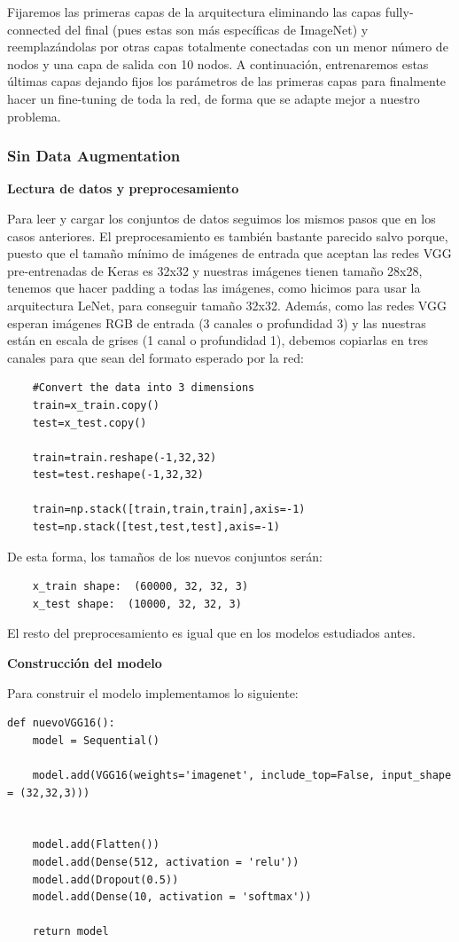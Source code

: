 \documentclass[a4paper,11pt]{article}
\begin{document}
Fijaremos las primeras capas de la arquitectura eliminando las capas fully-connected del final (pues estas son más específicas de ImageNet) y reemplazándolas por otras capas totalmente conectadas con un menor número de nodos y una capa de salida con 10 nodos. A continuación, entrenaremos estas últimas capas dejando fijos los parámetros de las primeras capas para finalmente hacer un fine-tuning de toda la red, de forma que se adapte mejor a nuestro problema. 

\subsubsection{Sin Data Augmentation}
\textbf{Lectura de datos y preprocesamiento}

Para leer y cargar los conjuntos de datos seguimos los mismos pasos que en los casos anteriores. El preprocesamiento es también bastante parecido salvo porque, puesto que el tamaño mínimo de imágenes de entrada que aceptan las redes VGG pre-entrenadas de Keras es 32x32 y nuestras imágenes tienen tamaño 28x28, tenemos que hacer padding a todas las imágenes, como hicimos para usar la arquitectura LeNet, para conseguir tamaño 32x32. Además, como las redes VGG esperan imágenes RGB de entrada (3 canales o profundidad 3) y las nuestras están en escala de grises (1 canal o profundidad 1), debemos copiarlas en tres canales para que sean del formato esperado por la red:
\begin{verbatim}
	#Convert the data into 3 dimensions
	train=x_train.copy()
	test=x_test.copy()
	
	train=train.reshape(-1,32,32)
	test=test.reshape(-1,32,32)
	
	train=np.stack([train,train,train],axis=-1)
	test=np.stack([test,test,test],axis=-1)	
\end{verbatim}
De esta forma, los tamaños de los nuevos conjuntos serán:
\begin{verbatim}
	x_train shape:  (60000, 32, 32, 3)
	x_test shape:  (10000, 32, 32, 3)
\end{verbatim}

El resto del preprocesamiento es igual que en los modelos estudiados antes. 

\textbf{Construcción del modelo}

Para construir el modelo implementamos lo siguiente:
\begin{verbatim}
def nuevoVGG16():
	model = Sequential()
	
	model.add(VGG16(weights='imagenet', include_top=False, input_shape = (32,32,3)))
	
	
	model.add(Flatten())
	model.add(Dense(512, activation = 'relu'))
	model.add(Dropout(0.5))
	model.add(Dense(10, activation = 'softmax'))
	
	return model
\end{verbatim}
\end{document}

